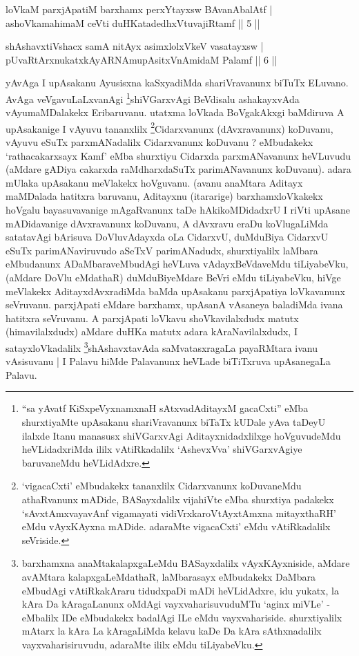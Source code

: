\begin{shl}
loVkaM parxjApatiM barxhamx perxYtayxsw BAvanAbalAtf | \\
ashoVkamahimaM ceVti duHKatadedhxVtuvajiRtamf \hfill ||  5 || 
\end{shl}

\begin{shl}
shAshavxtiVshacx samA nitAyx asimxlolxVkeV vasatayxsw  | \\
pUvaRtArxnukatxkAyARNAmupAsitxVnAmidaM Palamf \hfill ||  6 || 
\end{shl}

\begin{artha}
yAvAga I upAsakanu Ayusisxna kaSxyadiMda shariVravanunx biTuTx ELuvano. AvAga veVgavuLaLxvanAgi \footnote{``sa yAvatf KiSxpeVyxnamxnaH sAtxvadAditayxM gacaCxti'' eMba shurxtiyaMte upAsakanu shariVravanunx biTaTx kUDale yAva taDeyU ilalxde Itanu manasusx shiVGarxvAgi Aditayxnidadxlilxge hoVguvudeMdu heVLidadxriMda ililx vAtiRkadalilx `AshevxVva' shiVGarxvAgiye baruvaneMdu heVLidAdxre.}shiVGarxvAgi BeVdisalu ashakayxvAda vAyumaMDalakekx Eribaruvanu. utatxma loVkada BoVgakAkxgi baMdiruva A upAsakanige I vAyuvu tananxlilx \footnote{`vigacaCxti' eMbudakekx tananxlilx Cidarxvanunx koDuvaneMdu athaRvanunx mADide, BASayxdalilx vija{\null}hiVte eMba shurxtiya padakekx `sAvxtAmxvayavAnf vigamayati vidiVrxkaroVtAyxtAmxna mitayxthaRH' eMdu vAyxKAyxna mADide. adaraMte vigacaCxti' eMdu vAtiRkadalilx seVriside.}Cidarxvanunx (dAvxravanunx) koDuvanu, vAyuvu eSuTx parxmANadalilx Cidarxvanunx koDuvanu ? eMbudakekx `rathacakarxsayx Kamf' eMba shurxtiyu Cidarxda parxmANavanunx heVLuvudu (aMdare gADiya cakarxda raMdharxdaSuTx parimANavanunx koDuvanu). adara mUlaka upAsakanu meVlakekx hoVguvanu. (avanu anaMtara Aditayx maMDalada hatitxra baruvanu, Aditayxnu (itararige) barxhamxloVkakekx hoVgalu bayasuvavanige mAgaRvanunx taDe hAkikoMDidadxrU I riVti upAsane mADidavanige dAvxravanunx koDuvanu, A dAvxravu eraDu koVlugaLiMda satatavAgi bArisuva DoVluvAdayxda oLa CidarxvU, duMduBiya CidarxvU eSuTx parimANaviruvudo aSeTxV parimANadudx, shurxtiyalilx laMbara eMbudanunx ADaMbaraveMbudAgi heVLuva vAdayxBeVdaveMdu tiLiyabeVku, (aMdare DoVlu eMdathaR) duMduBiyeMdare BeVri eMdu tiLiyabeVku, hiVge meVlakekx AditayxdAvxradiMda baMda upAsakanu parxjApatiya loVkavanunx seVruvanu. parxjApati eMdare barxhamx, upAsanA vAsaneya baladiMda ivana hatitxra seVruvanu. A parxjApati loVkavu shoVkavilalxdudx matutx (himavilalxdudx) aMdare duHKa matutx adara kAraNavilalxdudx, I satayxloVkadalilx \footnote{barxhamxna anaMtakalapxgaLeMdu BASayxdalilx vAyxKAyxniside, aMdare avAMtara kalapxgaLeMdathaR, laMbarasayx eMbudakekx DaMbara eMbudAgi vAtiRkakAraru tidudxpaDi mADi heVLidAdxre, idu yukatx, la kAra Da kAragaLanunx oMdAgi vayxvaharisuvuduMTu `aginx miVLe' - eMbalilx IDe eMbudakekx badalAgi ILe eMdu vayxvahariside. shurxtiyalilx mAtarx la kAra La kAragaLiMda kelavu kaDe Da kAra sAthxnadalilx vayxvaharisiruvudu, adaraMte ililx eMdu tiLiyabeVku.}shAshavxtavAda saMvatasxragaLa payaRMtara ivanu vAsisuvanu | I Palavu hiMde Palavanunx heVLade biTiTxruva upAsanegaLa Palavu.
\end{artha}

\centerline{}
